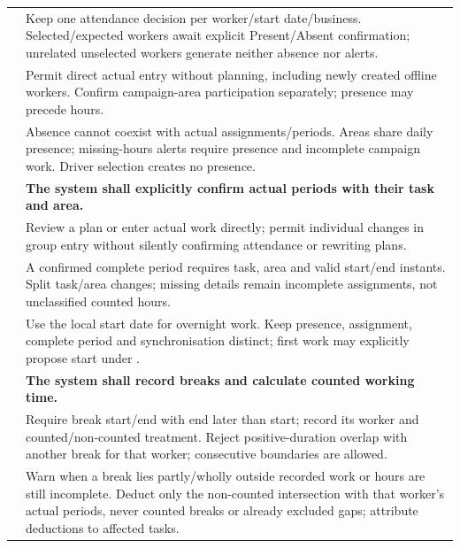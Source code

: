 {\begin{longtable}{L{0.18}L{0.82}}
\label{ac:030:a} & Keep one attendance decision per worker/start date/business. Selected/expected workers await explicit Present/Absent confirmation; unrelated unselected workers generate neither absence nor alerts.\\
\label{ac:030:b} & Permit direct actual entry without planning, including newly created offline workers. Confirm campaign-area participation separately; presence may precede hours.\\
\label{ac:030:c} & Absence cannot coexist with actual assignments/periods. Areas share daily presence; missing-hours alerts require presence and incomplete campaign work. Driver selection creates no presence.\\
\midrule
{}
\label{fr:031}\textbf{} & \textbf{The system shall explicitly confirm actual periods with their task and area.}\\*
\label{ac:031:a} & Review a plan or enter actual work directly; permit individual changes in group entry without silently confirming attendance or rewriting plans.\\
\label{ac:031:b} & A confirmed complete period requires task, area and valid start/end instants. Split task/area changes; missing details remain incomplete assignments, not unclassified counted hours.\\
\label{ac:031:c} & Use the local start date for overnight work. Keep presence, assignment, complete period and synchronisation distinct; first work may explicitly propose start under .\\
\midrule
{}
\label{fr:032}\textbf{} & \textbf{The system shall record breaks and calculate counted working time.}\\*
\label{ac:032:a} & Require break start/end with end later than start; record its worker and counted/non-counted treatment. Reject positive-duration overlap with another break for that worker; consecutive boundaries are allowed.\\
\label{ac:032:b} & Warn when a break lies partly/wholly outside recorded work or hours are still incomplete. Deduct only the non-counted intersection with that worker's actual periods, never counted breaks or already excluded gaps; attribute deductions to affected tasks.\\

\end{longtable}}
